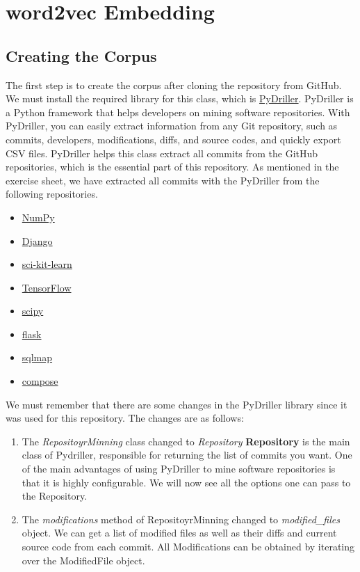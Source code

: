 \section{word2vec Embedding}\nocite{vulndetection}
\subsection{\textbf{Creating the Corpus}}

The first step is to create the corpus after cloning the repository from GitHub. We must install the required library for this class, which is \href{https://pydriller.readthedocs.io/en/latest/}{PyDriller}. 
\newline
PyDriller is a Python framework that helps developers on mining software repositories. With PyDriller, you can easily extract information from any Git repository, such as commits, developers, modifications, diffs, and source codes, and quickly export CSV files. \cite{pydriller}
\newline
PyDriller helps this class extract all commits from the GitHub repositories, which is the essential part of this repository. As mentioned in the exercise sheet, we have extracted all commits with the PyDriller from the following repositories.
\begin{itemize}
    \item \href{https://github.com/numpy/numpy}{NumPy}
    \item \href{https://github.com/django/django}{Django}
    \item \href{https://github.com/scikit-learn/scikit-learn}{sci-kit-learn}
    \item \href{https://github.com/tensorflow/tensorflow}{TensorFlow}
    \item \href{https://github.com/scipy/scipy}{scipy}
    \item \href{https://github.com/pallets/flask}{flask}
    \item \href{https://github.com/sqlmapproject/sqlmap}{sqlmap}
    \item \href{https://github.com/docker/compose}{compose}
\end{itemize}
We must remember that there are some changes in the PyDriller library since it was used for this repository. The changes are as follows:
\begin{enumerate}
    \item The \textit{RepositoyrMinning} class changed to \textit{Repository} \newline \textbf{Repository} is the main class of Pydriller, responsible for returning the list of commits you want. One of the main advantages of using PyDriller to mine software repositories is that it is highly configurable. We will now see all the options one can pass to the Repository.

    \item The \textit{modifications} method of RepositoyrMinning changed to 
        \textit{modified\_files} object. \newline We can get a list of modified files as well as their diffs and current source code from each commit. All Modifications can be obtained by iterating over the ModifiedFile object.
\end{enumerate}

